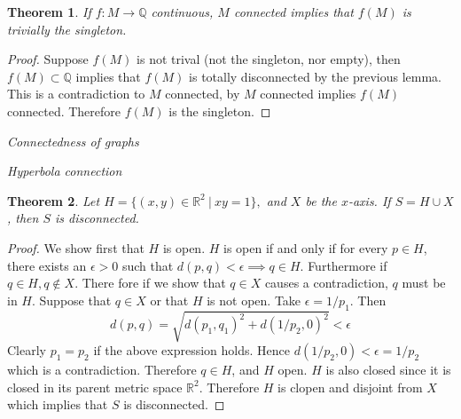 \documentclass[letter]{article}
\newtheorem{theorem}{Theorem}
\newenvironment{menumerate}{%
  \edef\backupindent{\the\parindent}%
  \enumerate%
  \setlength{\parindent}{\backupindent}%
}{\endenumerate}
\begin{document}
\begin{menumerate}
\begin{menumerate}
				\begin{theorem}
					If $f:M\to\mathbb{Q}$ continuous, $M$ connected implies that $f(M)$ is trivially the singleton.
				\end{theorem}
				\begin{proof}
					Suppose $f(M)$ is not trival (not the singleton, nor empty), then $f(M) \subset \mathbb{Q}$ implies that $f(M)$ is totally disconnected by the previous lemma. This is a contradiction to $M$ connected, by $M$ connected implies $f(M)$ connected. Therefore $f(M)$ is the singleton.
				\end{proof}
		\end{menumerate}
	\setcounter{enumi}{71}
	\item \emph{Connectedness of graphs}
		\begin{menumerate}
			\item \emph{Hyperbola connection}
			\begin{theorem}
				Let $H = \{ (x,y) \in \mathbb{R}^2\ |\ xy = 1\},$ and $X$ be the $x$-axis. If $S = H \cup X$, then $S$ is disconnected.
			\end{theorem}
			\begin{proof}
				We show first that $H$ is open. $H$ is open if and only if for every $p\in H$, there exists an $\epsilon > 0$ such that $d(p,q) < \epsilon \implies q \in H$. Furthermore if $q \in H, q \notin X.$ There fore if we show that $q \in X$ causes a contradiction, $q$ must be in $H.$ Suppose that $q \in X$ or that $H$ is not open. Take $\epsilon = 1/p_1$. Then $$d(p,q) = \sqrt{d(p_1,q_1)^2 + d(1/p_2, 0)^2} < \epsilon$$Clearly $p_1 = p_2$ if the above expression holds. Hence $d(1/p_2,0) < \epsilon = 1/p_2$ which is a contradiction. Therefore $q \in H$, and $H$ open. 
				$H$ is also closed since it is closed in its parent metric space $\mathbb{R}^2.$ Therefore $H$ is clopen and disjoint from $X$ which implies that $S$ is disconnected.
			\end{proof}


\end{menumerate}
\end{menumerate}
\end{document}
